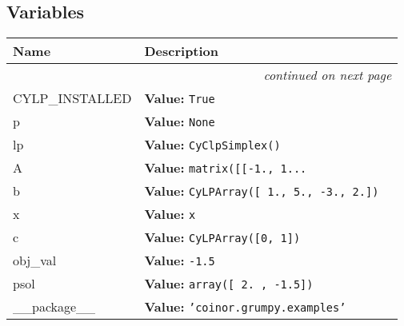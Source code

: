 
  \subsection{Variables}

    \vspace{-1cm}
\hspace{\varindent}\begin{longtable}{|p{\varnamewidth}|p{\vardescrwidth}|l}
\cline{1-2}
\cline{1-2} \centering \textbf{Name} & \centering \textbf{Description}& \\
\cline{1-2}
\endhead\cline{1-2}\multicolumn{3}{r}{\small\textit{continued on next page}}\\\endfoot\cline{1-2}
\endlastfoot\raggedright C\-Y\-L\-P\-\_\-I\-N\-S\-T\-A\-L\-L\-E\-D\- & \raggedright \textbf{Value:} 
{\tt True}&\\
\cline{1-2}
\raggedright p\- & \raggedright \textbf{Value:} 
{\tt None}&\\
\cline{1-2}
\raggedright l\-p\- & \raggedright \textbf{Value:} 
{\tt CyClpSimplex()}&\\
\cline{1-2}
\raggedright A\- & \raggedright \textbf{Value:} 
{\tt matrix([[-1.,  1\texttt{...}}&\\
\cline{1-2}
\raggedright b\- & \raggedright \textbf{Value:} 
{\tt CyLPArray([ 1.,  5., -3.,  2.])}&\\
\cline{1-2}
\raggedright x\- & \raggedright \textbf{Value:} 
{\tt x}&\\
\cline{1-2}
\raggedright c\- & \raggedright \textbf{Value:} 
{\tt CyLPArray([0, 1])}&\\
\cline{1-2}
\raggedright o\-b\-j\-\_\-v\-a\-l\- & \raggedright \textbf{Value:} 
{\tt -1.5}&\\
\cline{1-2}
\raggedright p\-s\-o\-l\- & \raggedright \textbf{Value:} 
{\tt array([ 2. , -1.5])}&\\
\cline{1-2}
\raggedright \_\-\_\-p\-a\-c\-k\-a\-g\-e\-\_\-\_\- & \raggedright \textbf{Value:} 
{\tt \texttt{'}\texttt{coinor.grumpy.examples}\texttt{'}}&\\
\cline{1-2}
\end{longtable}

